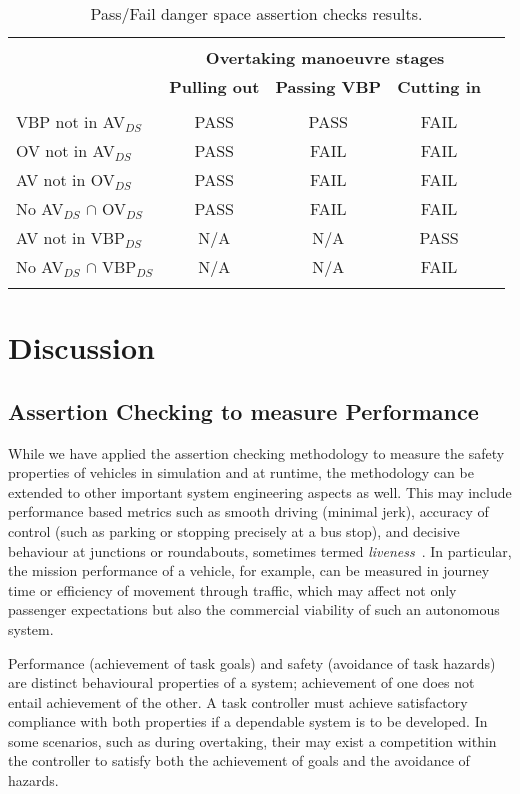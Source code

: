 \begin{table}[h]
\centering
\begin{tabular}{ lcccc }
\hline
\\
\multirow{3}{*}{\textbf{}} & \multicolumn{3}{c}{\textbf{Overtaking manoeuvre stages}}\\
\textbf{Assertion} & \textbf{Pulling out} & \textbf{Passing VBP} & \textbf{Cutting in} & \\
&  &  &  & \\
VBP not in AV$_{DS}$ & PASS & PASS & FAIL\\
%
OV not in AV$_{DS}$ & PASS & FAIL & FAIL\\
%
AV not in OV$_{DS}$  & PASS & FAIL & FAIL\\
%
No AV$_{DS}$ $\cap$ OV$_{DS}$  & PASS & FAIL & FAIL\\
%
AV not in VBP$_{DS}$  & N/A & N/A & PASS\\
%
No AV$_{DS}$ $\cap$ VBP$_{DS}$  & N/A & N/A & FAIL\\
%
\\
\hline
\end{tabular}
\caption{Pass/Fail danger space assertion checks results.} \label{Overtaking_DS_table}
\end{table}

\section{Discussion} \label{discussion}

\subsection{Assertion Checking to measure Performance}
While we have applied the assertion checking methodology to measure the safety properties of vehicles in simulation and at runtime, the methodology can be extended to other important system engineering aspects as well. This may include performance based metrics such as smooth driving (minimal jerk), accuracy of control (such as parking or stopping precisely at a bus stop), and decisive behaviour at junctions or roundabouts, sometimes termed \emph{liveness}~\cite{kim2014mpc}. In particular, the mission performance of a vehicle, for example, can be measured in journey time or efficiency of movement through traffic, which may affect not only passenger expectations but also the commercial viability of such an autonomous system. 

Performance (achievement of task goals) and safety (avoidance of task hazards) are distinct behavioural properties of a system; achievement of one does not entail achievement of the other. A task controller must achieve satisfactory compliance with both properties if a dependable system is to be developed. In some scenarios, such as during overtaking, their may exist a competition within the controller to satisfy both the achievement of goals and the avoidance of hazards. 

